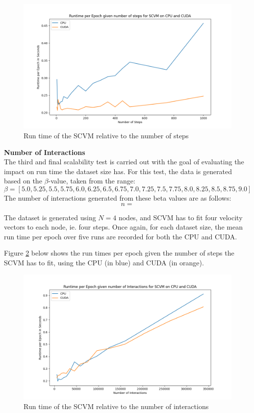 \begin{figure}[H]
    \centering
    \includegraphics[width=\textwidth]{0_images/steps_runtime2.png}
    \caption{Run time of the SCVM relative to the number of steps}
    \label{fig:NumStepsRuntimes}
\end{figure}
\textbf{Number of Interactions}
\\
The third and final scalability test is carried out with the goal of evaluating the impact on run time the dataset size has.
For this test, the data is generated based on the $\beta$-value, taken from the range:
\begin{equation}
    \beta = [5.0, 5.25, 5.5, 5.75, 6.0, 6.25, 6.5, 6.75, 7.0, 7.25, 7.5, 7.75, 8.0, 8.25, 8.5, 8.75, 9.0]
\end{equation}
The number of interactions generated from these beta values are as follows:
\begin{equation}
    n = 
\end{equation}

The dataset is generated using $N = 4$ nodes, and SCVM has to fit four velocity vectors to each node, ie. four steps.
Once again, for each dataset size, the mean run time per epoch over five runs are recorded for both the CPU and CUDA.

Figure \ref{fig:NumInteractionsRuntimes} below shows the run times per epoch given the number of steps the SCVM has to fit, using the CPU (in blue) and CUDA (in orange).


\begin{figure}[H]
    \centering
    \includegraphics[width=\textwidth]{0_images/numinteractions_runtime2.png}
    \caption{Run time of the SCVM relative to the number of interactions}
    \label{fig:NumInteractionsRuntimes}
\end{figure}
